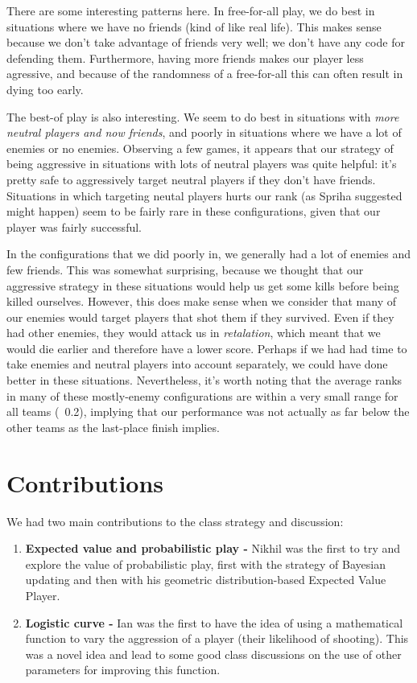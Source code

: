 \documentclass[
10pt, %
letterpaper, %
oneside, %
headinclude,footinclude, %
english
]{article}
\begin{document}
There are some interesting patterns here. In free-for-all play, we do best in situations where we have no friends (kind of like real life). This makes sense because we don't take advantage of friends very well; we don't have any code for defending them. Furthermore, having more friends makes our player less agressive, and because of the randomness of a free-for-all this can often result in dying too early.

The best-of play is also interesting. We seem to do best in situations with \textit{more neutral players and now friends}, and poorly in situations where we have a lot of enemies or no enemies. Observing a few games, it appears that our strategy of being aggressive in situations with lots of neutral players was quite helpful: it's pretty safe to aggressively target neutral players if they don't have friends. Situations in which targeting neutal players hurts our rank (as Spriha suggested might happen) seem to be fairly rare in these configurations, given that our player was fairly successful.

In the configurations that we did poorly in, we generally had a lot of enemies and few friends. This was somewhat surprising, because we thought that our aggressive strategy in these situations would help us get some kills before being killed ourselves. However, this does make sense when we consider that many of our enemies would target players that shot them if they survived. Even if they had other enemies, they would attack us in \textit{retalation}, which meant that we would die earlier and therefore have a lower score. Perhaps if we had had time to take enemies and neutral players into account separately, we could have done better in these situations. Nevertheless, it's worth noting that the average ranks in many of these mostly-enemy configurations are within a very small range for all teams (~0.2), implying that our performance was not actually as far below the other teams as the last-place finish implies.

\section{Contributions}

We had two main contributions to the class strategy and discussion:
\begin{enumerate}
  \item \textbf{Expected value and probabilistic play -} Nikhil was the first to try and explore the value of probabilistic play, first with the strategy of Bayesian updating and then with his geometric distribution-based Expected Value Player.
  \item \textbf{Logistic curve -} Ian was the first to have the idea of using a mathematical function to vary the aggression of a player (their likelihood of shooting). This was a novel idea and lead to some good class discussions on the use of other parameters for improving this function.
\end{enumerate}
\end{document}
